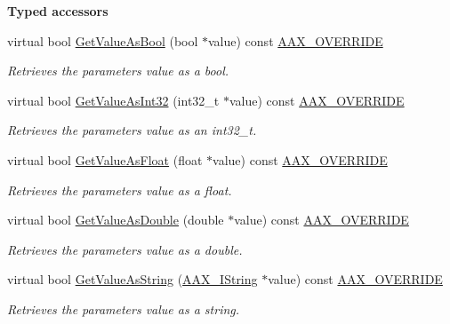 \begin{Indent}{\bf Typed accessors}\par
\begin{DoxyCompactItemize}
\item 
virtual bool \hyperlink{a00035_a7b299559a4cc6de5ef4a77dae32c99e3}{Get\+Value\+As\+Bool} (bool $\ast$value) const \hyperlink{a00149_ac2f24a5172689ae684344abdcce55463}{A\+A\+X\+\_\+\+O\+V\+E\+R\+R\+I\+D\+E}
\begin{DoxyCompactList}\small\item\em Retrieves the parameter\textquotesingle{}s value as a bool. \end{DoxyCompactList}\item 
virtual bool \hyperlink{a00035_a0688f74f24ea0b022b89e188c7e253da}{Get\+Value\+As\+Int32} (int32\+\_\+t $\ast$value) const \hyperlink{a00149_ac2f24a5172689ae684344abdcce55463}{A\+A\+X\+\_\+\+O\+V\+E\+R\+R\+I\+D\+E}
\begin{DoxyCompactList}\small\item\em Retrieves the parameter\textquotesingle{}s value as an int32\+\_\+t. \end{DoxyCompactList}\item 
virtual bool \hyperlink{a00035_ac3301a3dc20e65906caa5610897a2a1a}{Get\+Value\+As\+Float} (float $\ast$value) const \hyperlink{a00149_ac2f24a5172689ae684344abdcce55463}{A\+A\+X\+\_\+\+O\+V\+E\+R\+R\+I\+D\+E}
\begin{DoxyCompactList}\small\item\em Retrieves the parameter\textquotesingle{}s value as a float. \end{DoxyCompactList}\item 
virtual bool \hyperlink{a00035_a21e7a9e774cf81aa055d99cfb7f2a222}{Get\+Value\+As\+Double} (double $\ast$value) const \hyperlink{a00149_ac2f24a5172689ae684344abdcce55463}{A\+A\+X\+\_\+\+O\+V\+E\+R\+R\+I\+D\+E}
\begin{DoxyCompactList}\small\item\em Retrieves the parameter\textquotesingle{}s value as a double. \end{DoxyCompactList}\item 
virtual bool \hyperlink{a00035_a35153159e40183807eae373c21b38bcc}{Get\+Value\+As\+String} (\hyperlink{a00113}{A\+A\+X\+\_\+\+I\+String} $\ast$value) const \hyperlink{a00149_ac2f24a5172689ae684344abdcce55463}{A\+A\+X\+\_\+\+O\+V\+E\+R\+R\+I\+D\+E}
\begin{DoxyCompactList}\small\item\em Retrieves the parameter\textquotesingle{}s value as a string. \end{DoxyCompactList}\end{DoxyCompactItemize}
\end{Indent}


